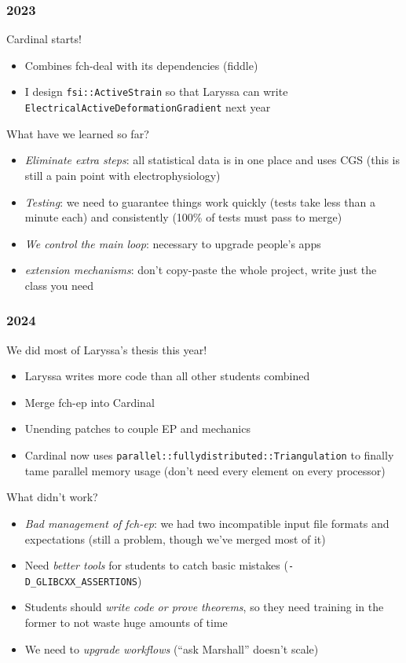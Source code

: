 \documentclass[8pt]{beamer}
\begin{document}
\begin{frame}
  \frametitle{2023}
  Cardinal starts!
  \begin{itemize}
    \item[$\blacksquare$] Combines fch-deal with its dependencies (fiddle)
    \item[$\blacksquare$] I design \texttt{fsi::ActiveStrain} so that Laryssa can write
      \texttt{ElectricalActiveDeformationGradient} next year
  \end{itemize}
  \vfill

  What have we learned so far?
  \begin{itemize}
    \item[$\blacksquare$] \emph{Eliminate extra steps}: all statistical data is in one place
      and uses CGS (this is still a pain point with electrophysiology)
    \item[$\blacksquare$] \emph{Testing}: we need to guarantee things work quickly (tests take
      less than a minute each) and consistently (100\% of tests must pass to merge)
    \item[$\blacksquare$] \emph{We control the main loop}: necessary to upgrade people's apps
    \item[$\blacksquare$] \emph{extension mechanisms}: don't copy-paste the whole project, write
      just the class you need
  \end{itemize}
\end{frame}

\begin{frame}
  \frametitle{2024}
  We did most of Laryssa's thesis this year!
  \begin{itemize}
    \item[$\blacksquare$] Laryssa writes more code than all other students combined
    \item[$\blacksquare$] Merge fch-ep into Cardinal
    \item[$\blacksquare$] Unending patches to couple EP and mechanics
    \item[$\blacksquare$] Cardinal now uses \texttt{parallel::fullydistributed::Triangulation}
      to finally tame parallel memory usage (don't need every element on every
      processor)
  \end{itemize}
  \vfill

  What didn't work?
  \begin{itemize}
    \item[$\blacksquare$] \emph{Bad management of fch-ep}: we had two incompatible input file
      formats and expectations (still a problem, though we've merged most of it)
    \item[$\blacksquare$] Need \emph{better tools} for students to catch basic mistakes
      (\texttt{-D\_GLIBCXX\_ASSERTIONS})
    \item[$\blacksquare$] Students should \emph{write code or prove theorems}, so they need
      training in the former to not waste huge amounts of time
    \item[$\blacksquare$] We need to \emph{upgrade workflows} (``ask Marshall'' doesn't scale)
  \end{itemize}
\end{frame}
\end{document}

